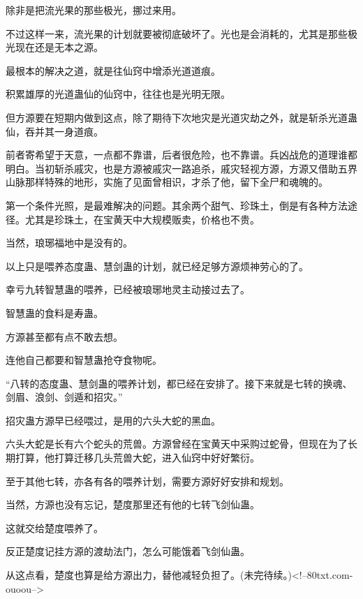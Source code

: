\begin{this_body}
除非是把流光果的那些极光，挪过来用。

不过这样一来，流光果的计划就要被彻底破坏了。光也是会消耗的，尤其是那些极光现在还是无本之源。

最根本的解决之道，就是往仙窍中增添光道道痕。

积累雄厚的光道蛊仙的仙窍中，往往也是光明无限。

但方源要在短期内做到这点，除了期待下次地灾是光道灾劫之外，就是斩杀光道蛊仙，吞并其一身道痕。

前者寄希望于天意，一点都不靠谱，后者很危险，也不靠谱。兵凶战危的道理谁都明白。当初斩杀戚灾，也是方源被戚灾一路追杀，戚灾轻视方源，方源又借助五界山脉那样特殊的地形，实施了见面曾相识，才杀了他，留下全尸和魂魄的。

第一个条件光照，是最难解决的问题。其余两个甜气、珍珠土，倒是有各种方法途径。尤其是珍珠土，在宝黄天中大规模贩卖，价格也不贵。

当然，琅琊福地中是没有的。

以上只是喂养态度蛊、慧剑蛊的计划，就已经足够方源烦神劳心的了。

幸亏九转智慧蛊的喂养，已经被琅琊地灵主动接过去了。

智慧蛊的食料是寿蛊。

方源甚至都有点不敢去想。

连他自己都要和智慧蛊抢夺食物呢。

“八转的态度蛊、慧剑蛊的喂养计划，都已经在安排了。接下来就是七转的换魂、剑眉、浪剑、剑遁和招灾。”

招灾蛊方源早已经喂过，是用的六头大蛇的黑血。

六头大蛇是长有六个蛇头的荒兽。方源曾经在宝黄天中采购过蛇骨，但现在为了长期打算，他打算迁移几头荒兽大蛇，进入仙窍中好好繁衍。

至于其他七转，亦各有各的喂养计划，需要方源好好安排和规划。

当然，方源也没有忘记，楚度那里还有他的七转飞剑仙蛊。

这就交给楚度喂养了。

反正楚度记挂方源的渡劫法门，怎么可能饿着飞剑仙蛊。

从这点看，楚度也算是给方源出力，替他减轻负担了。(未完待续。)<!--80txt.com-ouoou-->

\end{this_body}

